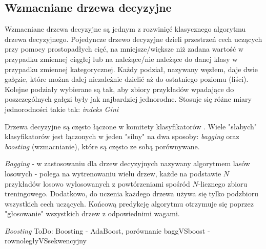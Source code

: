 \subsection{Wzmacniane drzewa decyzyjne}
\label{subsec:drzewa}

Wzmacniane drzewa decyzyjne są jednym z rozwinięć klasycznego algorytmu drzewa decyzyjnego. 
Pojedyncze drzewo decyzyjne dzieli przestrzeń cech uczących przy pomocy prostopadłych cięć, na mniejsze/większe niż zadana wartość w przypadku zmiennej ciągłej lub na należące/nie należące do danej klasy w przypadku zmiennej kategorycznej. Każdy podział, nazywany węzłem, daje dwie gałęzie, które można dalej niezależnie dzielić aż do ostatniego poziomu (liści). Kolejne podziały wybierane są tak, aby zbiory przykładów wpadające do poszczególnych gałęzi były jak najbardziej jednorodne. Stosuje się różne miary jednorodności takie tak: \textit{indeks Gini}

Drzewa decyzyjne są często łączone w komitety klasyfikatorów . Wiele "słabych" klasyfikatorów jest łączonych w jeden "silny" na dwa sposoby: \textit{bagging} oraz \textit{boosting} (wzmacnianie), które są często ze sobą porównywane.

\textit{Bagging} - w zastosowaniu dla drzew decyzyjnych nazywany algorytmem lasów losowych  - polega na wytrenowaniu wielu drzew, każde na podstawie $N$ przykładów losowo wylosowanych z powtórzeniami spośród $N$-licznego zbioru treningowego. Dodatkowo, do uczenia każdego drzewa używa się tylko podzbioru wszystkich cech uczących. Końcową predykcję algorytmu otrzymuje się poprzez "głosowanie" wszystkich drzew z odpowiednimi wagami.

\textit{Boosting} 
ToDo: Boosting - AdaBoost, porównanie baggVSboost - rownoległyVSsekwencyjny
